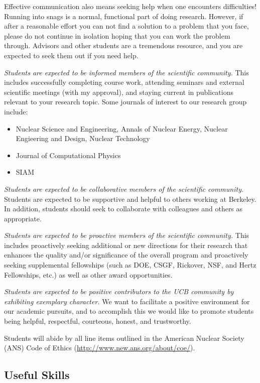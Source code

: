\documentclass[12pt,twoside]{article}
\begin{document}
Effective communication also means seeking help when one encounters difficulties! Running into snags is a normal, functional part of doing research. However, if after a reasonable effort you can not find a solution to a problem that you face, please do not continue in isolation hoping that you can work the problem through. Advisors and other students are a tremendous resource, and you are expected to seek them out if you need help.

\textit{Students are expected to be informed members of the scientific community.} This includes successfully completing course work, attending seminars and external scientific meetings (with my approval), and staying current in publications relevant to your research topic. Some journals of interest to our research group include: 
%
\begin{itemize}
\item Nuclear Science and Engineering, Annals of Nuclear Energy, Nuclear Engieering and Design, Nuclear Technology
\item Journal of Computational Physics
\item SIAM 
\end{itemize}

\textit{Students are expected to be collaborative members of the scientific community.} Students are expected to be supportive and helpful to others working at Berkeley. In addition, students should seek to collaborate with colleagues and others as appropriate.

\textit{Students are expected to be proactive members of the scientific community.} This includes proactively seeking additional or new directions for their research that enhances the quality and/or significance of the overall program and proactively seeking supplemental fellowships (such as DOE, CSGF, Rickover, NSF, and Hertz Fellowships, etc.) as well as other award opportunities.

\textit{Students are expected to be positive contributors to the UCB community by exhibiting exemplary character.} We want to facilitate a positive environment for our academic pursuits, and to accomplish this we would like to promote students being helpful, respectful, courteous, honest, and trustworthy. 

Students will abide by all line items outlined in the American Nuclear Society (ANS) Code of Ethics (\href{http://www.new.ans.org/about/coe/}{http://www.new.ans.org/about/coe/}). 

\begin{center}
\subsection*{Useful Skills}
\end{center}
\end{document}
